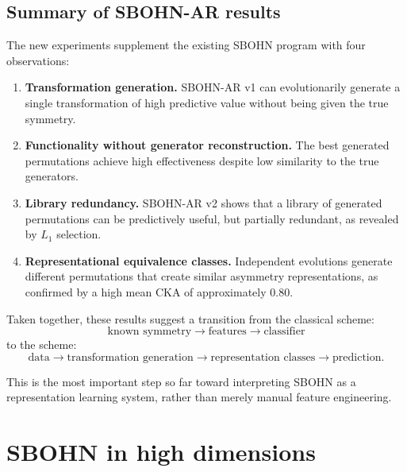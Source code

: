 \documentclass[11pt,a4paper]{report}
\begin{document}
\subsection{Summary of SBOHN-AR results}

The new experiments supplement the existing SBOHN program with four observations:

\begin{enumerate}
\item \textbf{Transformation generation.} SBOHN-AR v1 can evolutionarily generate a single transformation of high predictive value without being given the true symmetry.

\item \textbf{Functionality without generator reconstruction.} The best generated permutations achieve high effectiveness despite low similarity to the true generators.

\item \textbf{Library redundancy.} SBOHN-AR v2 shows that a library of generated permutations can be predictively useful, but partially redundant, as revealed by $L_1$ selection.

\item \textbf{Representational equivalence classes.} Independent evolutions generate different permutations that create similar asymmetry representations, as confirmed by a high mean CKA of approximately $0.80$.
\end{enumerate}

Taken together, these results suggest a transition from the classical scheme:
\[
\text{known symmetry}\rightarrow\text{features}\rightarrow\text{classifier}
\]
to the scheme:
\[
\text{data}\rightarrow\text{transformation generation}\rightarrow\text{representation classes}\rightarrow\text{prediction}.
\]

This is the most important step so far toward interpreting SBOHN as a representation learning system, rather than merely manual feature engineering.




\section{SBOHN in high dimensions}\label{sec:highdim}
\end{document}
